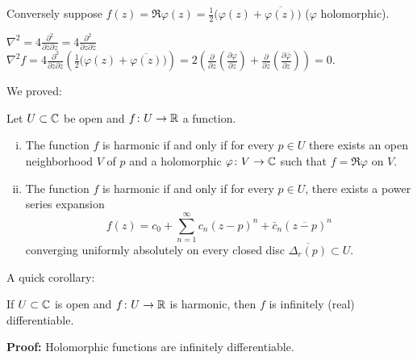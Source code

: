 \documentclass[10pt,aspectratio=169]{beamer}
\begin{document}
\begin{frame}
Conversely suppose
\qquad
$
f(z) = \Re \varphi(z) =
\tfrac{1}{2}\bigl( \varphi(z) + \overline{\varphi(z)} \bigr)$
\qquad ($\varphi$ holomorphic).

\medskip
\pause

$\displaystyle
\nabla^2 =
4 \frac{\partial^2}{\partial \bar{z} \partial z}
=
4 \frac{\partial^2}{\partial z \partial \bar{z}}
$
\pause
\wthus
$\displaystyle
\nabla^2 f =
4 \frac{\partial^2}{\partial \bar{z} \partial z}
\left(
\frac{1}{2}\bigl( \varphi(z) + \overline{\varphi(z)} \bigr)
\right)
=
2
\left(
\frac{\partial}{\partial z}
\left(
\frac{\partial \varphi}{\partial \bar{z}}
\right)+
\frac{\partial}{\partial \bar{z}}
\left(
\frac{\partial \bar{\varphi}}{\partial z}
\right)
\right)
=
0$.

\medskip

\pause
We proved:
\begin{proposition}
Let $U \subset {\mathbb{C}}$ be open and $f \colon U \to {\mathbb{R}}$ a function.
\begin{enumerate}[(i)]
\item
The function $f$ is harmonic if and only if
for every $p \in U$ there exists an open neighborhood $V$ of $p$ and a
holomorphic $\varphi \colon V \to {\mathbb{C}}$ such that $f = \Re \varphi$
on $V$.
\pause
\item
The function $f$ is harmonic if and only if
for every $p \in U$, there exists a power series expansion
\begin{equation*}
f(z) =
c_0 +
\sum_{n=1}^\infty c_n {(z-p)}^n + \bar{c}_n {(\overline{z-p})}^n
\end{equation*}
converging uniformly absolutely
on every closed disc $\overline{\Delta_r(p)} \subset U$.
\end{enumerate}
\end{proposition}

\end{frame}

\begin{frame}
A quick corollary:

\begin{proposition}
If $U \subset {\mathbb{C}}$ is open and $f \colon U \to {\mathbb{R}}$ is harmonic,
then $f$ is infinitely (real) differentiable.
\end{proposition}

\textbf{Proof:} Holomorphic functions are infinitely differentiable.

\end{frame}
\end{document}
